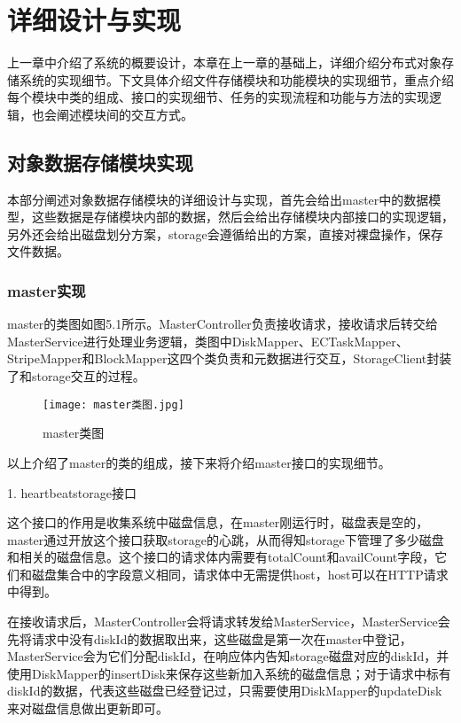 
\chapter{详细设计与实现}
上一章中介绍了系统的概要设计，本章在上一章的基础上，详细介绍分布式对象存储系统的实现细节。下文具体介绍文件存储模块和功能模块的实现细节，重点介绍每个模块中类的组成、接口的实现细节、任务的实现流程和功能与方法的实现逻辑，也会阐述模块间的交互方式。

\section{对象数据存储模块实现}%
本部分阐述对象数据存储模块的详细设计与实现，首先会给出master中的数据模型，这些数据是存储模块内部的数据，然后会给出存储模块内部接口的实现逻辑，另外还会给出磁盘划分方案，storage会遵循给出的方案，直接对裸盘操作，保存文件数据。

\subsection{master实现}%
master的类图如图5.1所示。MasterController负责接收请求，接收请求后转交给MasterService进行处理业务逻辑，类图中DiskMapper、ECTaskMapper、StripeMapper和BlockMapper这四个类负责和元数据进行交互，StorageClient封装了和storage交互的过程。

\begin{figure}
  \centering
  \texttt{[image: master类图.jpg]}
  \caption{master类图}
\end{figure}

以上介绍了master的类的组成，接下来将介绍master接口的实现细节。

1. heartbeatstorage接口

这个接口的作用是收集系统中磁盘信息，在master刚运行时，磁盘表是空的，master通过开放这个接口获取storage的心跳，从而得知storage下管理了多少磁盘和相关的磁盘信息。这个接口的请求体内需要有totalCount和availCount字段，它们和磁盘集合中的字段意义相同，请求体中无需提供host，host可以在HTTP请求中得到。

在接收请求后，MasterController会将请求转发给MasterService，MasterService会先将请求中没有diskId的数据取出来，这些磁盘是第一次在master中登记，MasterService会为它们分配diskId，在响应体内告知storage磁盘对应的diskId，并使用DiskMapper的insertDisk来保存这些新加入系统的磁盘信息；对于请求中标有diskId的数据，代表这些磁盘已经登记过，只需要使用DiskMapper的updateDisk来对磁盘信息做出更新即可。

